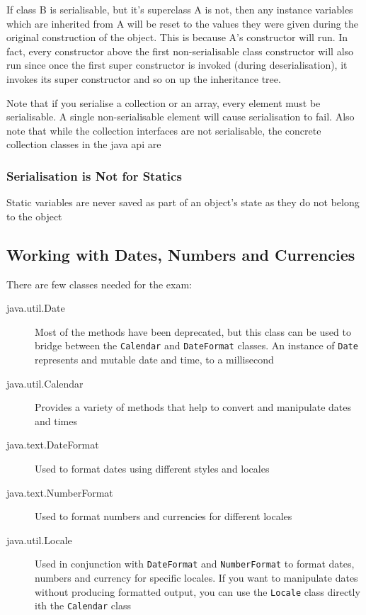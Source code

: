If class B is serialisable, but it's superclass A is not, then any instance 
variables which are inherited from A will be reset to the values they were 
given during the original construction of the object. This is because A's 
constructor will run. In fact, every constructor above the first 
non-serialisable class constructor will also run since once the first super 
constructor is invoked (during deserialisation), it invokes its super 
constructor and so on up the inheritance tree.

Note that if you serialise a collection or an array, every element must be 
serialisable. A single non-serialisable element will cause serialisation to 
fail. Also note that while the collection interfaces are not serialisable, the 
concrete collection classes in the java api are

\subsubsection{Serialisation is Not for Statics}
Static variables are never saved as part of an object's state as they do not 
belong to the object

\subsection{Working with Dates, Numbers and Currencies}
There are few classes needed for the exam:
\begin{description}
    \item[java.util.Date] Most of the methods have been deprecated, but this 
    class can be used to bridge between the \verb#Calendar# and 
    \verb#DateFormat# classes. An instance of \verb#Date# represents and mutable
    date and time, to a millisecond
    \item[java.util.Calendar] Provides a variety of methods that help to 
    convert and manipulate dates and times
    \item[java.text.DateFormat] Used to format dates using different styles and 
    locales
    \item[java.text.NumberFormat] Used to format numbers and currencies for 
    different locales
    \item[java.util.Locale] Used in conjunction with \verb#DateFormat# and 
    \verb#NumberFormat# to format dates, numbers and currency for specific 
    locales. If you want to manipulate dates without producing formatted 
    output, you can use the \verb#Locale# class directly ith the 
    \verb#Calendar# class
\end{description}

